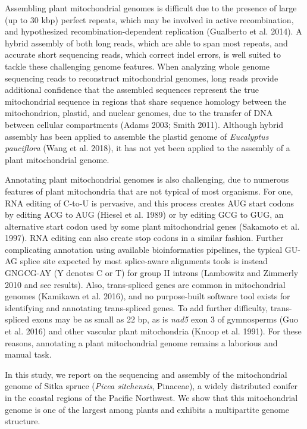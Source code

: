 \documentclass[
  12pt,
  oneside,
  openany]{book}
\begin{document}
Assembling plant mitochondrial genomes is difficult due to the presence of large (up to 30 kbp) perfect repeats, which may be involved in active recombination, and hypothesized recombination-dependent replication (Gualberto et al. 2014). A hybrid assembly of both long reads, which are able to span most repeats, and accurate short sequencing reads, which correct indel errors, is well suited to tackle these challenging genome features. When analyzing whole genome sequencing reads to reconstruct mitochondrial genomes, long reads provide additional confidence that the assembled sequences represent the true mitochondrial sequence in regions that share sequence homology between the mitochondrion, plastid, and nuclear genomes, due to the transfer of DNA between cellular compartments (Adams 2003; Smith 2011). Although hybrid assembly has been applied to assemble the plastid genome of \emph{Eucalyptus pauciflora} (Wang et al. 2018), it has not yet been applied to the assembly of a plant mitochondrial genome.

Annotating plant mitochondrial genomes is also challenging, due to numerous features of plant mitochondria that are not typical of most organisms. For one, RNA editing of C-to-U is pervasive, and this process creates AUG start codons by editing ACG to AUG (Hiesel et al. 1989) or by editing GCG to GUG, an alternative start codon used by some plant mitochondrial genes (Sakamoto et al. 1997). RNA editing can also create stop codons in a similar fashion. Further complicating annotation using available bioinformatics pipelines, the typical GU-AG splice site expected by most splice-aware alignments tools is instead GNGCG-AY (Y denotes C or T) for group II introns (Lambowitz and Zimmerly 2010 and see results). Also, trans-spliced genes are common in mitochondrial genomes (Kamikawa et al. 2016), and no purpose-built software tool exists for identifying and annotating trans-spliced genes. To add further difficulty, trans-spliced exons may be as small as 22 bp, as is \emph{nad5} exon 3 of gymnosperms (Guo et al. 2016) and other vascular plant mitochondria (Knoop et al. 1991). For these reasons, annotating a plant mitochondrial genome remains a laborious and manual task.

In this study, we report on the sequencing and assembly of the mitochondrial genome of Sitka spruce (\emph{Picea sitchensis}, Pinaceae), a widely distributed conifer in the coastal regions of the Pacific Northwest. We show that this mitochondrial genome is one of the largest among plants and exhibits a multipartite genome structure.
\end{document}
